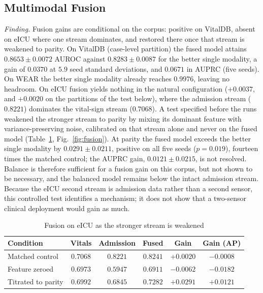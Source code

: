 \subsection{Multimodal Fusion}
\label{sec:results:fusion}
\emph{Finding.} Fusion gains are conditional on the corpus: positive on
VitalDB, absent on eICU where one stream dominates, and restored there once
that stream is weakened to parity.
On VitalDB (case-level partition) the fused model attains $0.8653 \pm 0.0072$ AUROC against
$0.8283 \pm 0.0087$ for the better single modality, a gain of $0.0370$ at
$5.9$ seed standard deviations, and $0.0671$ in AUPRC (five seeds). On WEAR
the better single modality already reaches $0.9976$, leaving no headroom. On
eICU fusion yields nothing in the natural configuration ($+0.0037$, and
$+0.0020$ on the partitions of the test below), where the admission stream
($0.8221$) dominates the vital-sign stream ($0.7068$). A
test specified before the runs weakened the stronger stream to parity by mixing its
dominant feature with variance-preserving noise, calibrated on that stream
alone and never on the fused model (Table~\ref{tab:fusion},
Fig.~\ref{fig:fusion}). At parity the fused model exceeds the better single
modality by $0.0291 \pm 0.0211$, positive on all five seeds ($p = 0.019$),
fourteen times the matched control; the AUPRC gain, $0.0121 \pm 0.0215$, is
not resolved. Balance is therefore sufficient for a fusion gain on this
corpus, but not shown to be necessary, and the balanced model remains below
the intact admission stream. Because the eICU second stream is admission
data rather than a second sensor, this controlled test identifies a mechanism;
it does not show that a two-sensor clinical deployment would gain as much.

\begin{table}[!t]
\centering
\caption{Fusion on eICU as the stronger stream is weakened}
\label{tab:fusion}
\setlength{\tabcolsep}{2.2pt}
\footnotesize
\begin{tabular}{lccccc}
\toprule
Condition & Vitals & Admission & Fused & Gain & Gain (AP) \\
\midrule
Matched control    & $0.7068$ & $0.8221$ & $0.8241$ & $+0.0020$ & $-0.0008$ \\
Feature zeroed     & $0.6973$ & $0.5947$ & $0.6911$ & $-0.0062$ & $-0.0182$ \\
Titrated to parity & $0.6992$ & $0.6845$ & $0.7282$ & $\mathbf{+0.0291}$ & $+0.0121$ \\
\bottomrule
\end{tabular}
\end{table}

